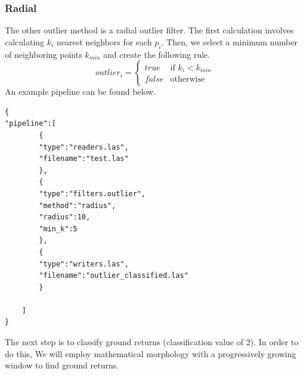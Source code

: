 \documentclass[11pt]{article}
\theoremstyle{definition}
\begin{document}
\subsubsection{Radial}\label{subsub:radial}
The other outlier method is a radial outlier filter.  The first calculation involves calculating $k_i$ nearest neighbors for each $p_i$.  Then, we select a minimum number of neighboring points $k_{min}$ and create the following rule.  
\begin{equation}\label{eqn:rad_rule}
outlier_{i}=\begin{cases}
true & \text{if $k_{i}<k_{min}$}\\
false & \text{otherwise}
\end{cases}
\end{equation}
An example pipeline can be found below.
\begin{lstlisting}[title=Radial outlier pipeline, label=radial]
{
"pipeline":[
		{
		"type":"readers.las",
		"filename":"test.las"
		},
		{
		"type":"filters.outlier",
		"method":"radius",
		"radius":10,
		"min_k":5
		},
		{
		"type":"writers.las",
		"filename":"outlier_classified.las"
		}

	]
}
\end{lstlisting} 

The next step is to classify ground returns (classification value of 2).  In order to do this, We will employ mathematical morphology with a progressively growing window to find ground returns.  
\end{document}
